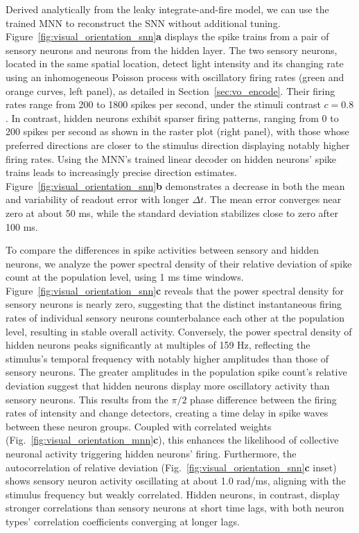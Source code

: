 Derived analytically from the leaky integrate-and-fire model,  we can use the trained MNN to reconstruct the SNN without additional tuning. 
Figure~\ref{fig:visual_orientation_snn}\textbf{a} displays the spike trains from a pair of sensory neurons and neurons from the hidden layer. 
The two sensory neurons, located in the same spatial location, detect light intensity and its changing rate using an inhomogeneous Poisson process with oscillatory firing rates (green and orange curves, left panel), as detailed in Section~\ref{sec:vo_encode}.
Their firing rates range from 200 to 1800 spikes per second, under the stimuli contrast \(c=0.8\). 
In contrast, hidden neurons exhibit sparser firing patterns, ranging from 0 to 200 spikes per second as shown in the raster plot (right panel), with those whose preferred directions are closer to the stimulus direction displaying notably higher firing rates.
Using the MNN's trained linear decoder on hidden neurons' spike trains leads to increasingly precise direction estimates. 
Figure~\ref{fig:visual_orientation_snn}\textbf{b} demonstrates a decrease in both the mean and variability of readout error with longer \(\Delta t\). 
The mean error converges near zero at about 50 ms, while the standard deviation stabilizes close to zero after 100 ms.

To compare the differences in spike activities between sensory and hidden neurons, we analyze the power spectral density of their relative deviation of spike count at the population level, using 1 ms time windows. 
Figure~\ref{fig:visual_orientation_snn}\textbf{c} reveals that the power spectral density for sensory neurons is nearly zero, suggesting that the distinct instantaneous firing rates of individual sensory neurons counterbalance each other at the population level, resulting in stable overall activity.
Conversely, the power spectral density of hidden neurons peaks significantly at multiples of 159 Hz, reflecting the stimulus's temporal frequency with notably higher amplitudes than those of sensory neurons.
The greater amplitudes in the population spike count's relative deviation suggest that hidden neurons display more oscillatory activity than sensory neurons.
This results from the \(\pi/2\) phase difference between the firing rates of intensity and change detectors, creating a time delay in spike waves between these neuron groups. 
Coupled with correlated weights (Fig.~\ref{fig:visual_orientation_mnn}\textbf{c}), this enhances the likelihood of collective neuronal activity triggering hidden neurons' firing.
Furthermore, the autocorrelation of relative deviation (Fig.~\ref{fig:visual_orientation_snn}\textbf{c} inset) shows sensory neuron activity oscillating at about 1.0 rad/ms, aligning with the stimulus frequency but weakly correlated. 
Hidden neurons, in contrast, display stronger correlations than sensory neurons at short time lags, with both neuron types' correlation coefficients converging at longer lags.

